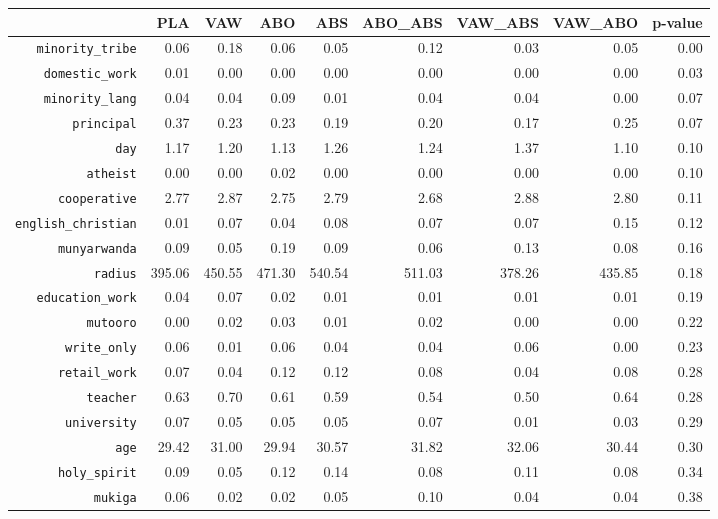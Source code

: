 \begin{longtable}{rrrrrrrrr}
  \hline
 & PLA & VAW & ABO & ABS & ABO\_ABS & VAW\_ABS & VAW\_ABO & p-value \\ 
  \hline
{\texttt{minority\_tribe}} & 0.06 & 0.18 & 0.06 & 0.05 & 0.12 & 0.03 & 0.05 & 0.00 \\ 
  {\texttt{domestic\_work}} & 0.01 & 0.00 & 0.00 & 0.00 & 0.00 & 0.00 & 0.00 & 0.03 \\ 
  {\texttt{minority\_lang}} & 0.04 & 0.04 & 0.09 & 0.01 & 0.04 & 0.04 & 0.00 & 0.07 \\ 
  {\texttt{principal}} & 0.37 & 0.23 & 0.23 & 0.19 & 0.20 & 0.17 & 0.25 & 0.07 \\ 
  {\texttt{day}} & 1.17 & 1.20 & 1.13 & 1.26 & 1.24 & 1.37 & 1.10 & 0.10 \\ 
  {\texttt{atheist}} & 0.00 & 0.00 & 0.02 & 0.00 & 0.00 & 0.00 & 0.00 & 0.10 \\ 
  {\texttt{cooperative}} & 2.77 & 2.87 & 2.75 & 2.79 & 2.68 & 2.88 & 2.80 & 0.11 \\ 
  {\texttt{english\_christian}} & 0.01 & 0.07 & 0.04 & 0.08 & 0.07 & 0.07 & 0.15 & 0.12 \\ 
  {\texttt{munyarwanda}} & 0.09 & 0.05 & 0.19 & 0.09 & 0.06 & 0.13 & 0.08 & 0.16 \\ 
  {\texttt{radius}} & 395.06 & 450.55 & 471.30 & 540.54 & 511.03 & 378.26 & 435.85 & 0.18 \\ 
  {\texttt{education\_work}} & 0.04 & 0.07 & 0.02 & 0.01 & 0.01 & 0.01 & 0.01 & 0.19 \\ 
  {\texttt{mutooro}} & 0.00 & 0.02 & 0.03 & 0.01 & 0.02 & 0.00 & 0.00 & 0.22 \\ 
  {\texttt{write\_only}} & 0.06 & 0.01 & 0.06 & 0.04 & 0.04 & 0.06 & 0.00 & 0.23 \\ 
  {\texttt{retail\_work}} & 0.07 & 0.04 & 0.12 & 0.12 & 0.08 & 0.04 & 0.08 & 0.28 \\ 
  {\texttt{teacher}} & 0.63 & 0.70 & 0.61 & 0.59 & 0.54 & 0.50 & 0.64 & 0.28 \\ 
  {\texttt{university}} & 0.07 & 0.05 & 0.05 & 0.05 & 0.07 & 0.01 & 0.03 & 0.29 \\ 
  {\texttt{age}} & 29.42 & 31.00 & 29.94 & 30.57 & 31.82 & 32.06 & 30.44 & 0.30 \\ 
  {\texttt{holy\_spirit}} & 0.09 & 0.05 & 0.12 & 0.14 & 0.08 & 0.11 & 0.08 & 0.34 \\ 
  {\texttt{mukiga}} & 0.06 & 0.02 & 0.02 & 0.05 & 0.10 & 0.04 & 0.04 & 0.38 \\ 

\end{longtable}
